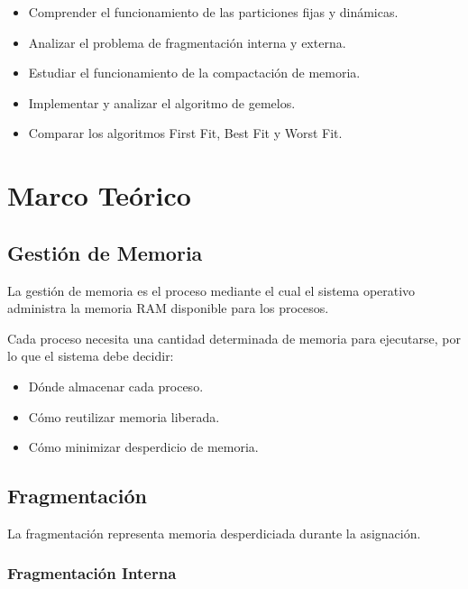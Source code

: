 \begin{itemize}
    \item Comprender el funcionamiento de las particiones fijas y dinámicas.
    
    \item Analizar el problema de fragmentación interna y externa.
    
    \item Estudiar el funcionamiento de la compactación de memoria.
    
    \item Implementar y analizar el algoritmo de gemelos.
    
    \item Comparar los algoritmos First Fit, Best Fit y Worst Fit.
\end{itemize}


\section{Marco Teórico}

\subsection{Gestión de Memoria}

La gestión de memoria es el proceso mediante el cual el sistema operativo administra la memoria RAM disponible para los procesos.

Cada proceso necesita una cantidad determinada de memoria para ejecutarse, por lo que el sistema debe decidir:

\begin{itemize}
    \item Dónde almacenar cada proceso.
    \item Cómo reutilizar memoria liberada.
    \item Cómo minimizar desperdicio de memoria.
\end{itemize}


\subsection{Fragmentación}

La fragmentación representa memoria desperdiciada durante la asignación.

\subsubsection{Fragmentación Interna}

